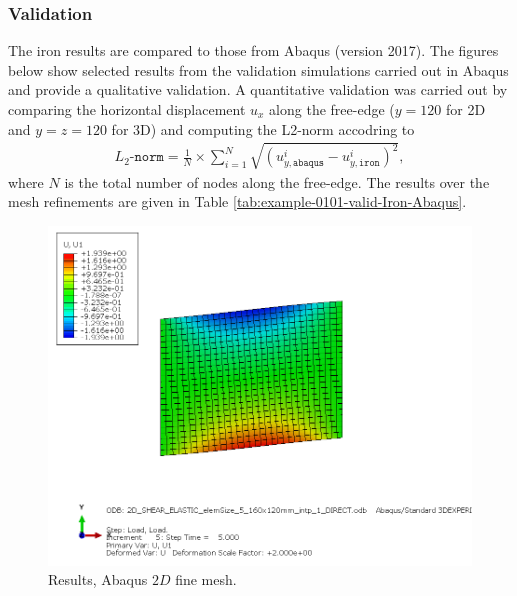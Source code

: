 \subsubsection{Validation}
%
The iron results are compared to those from Abaqus (version 2017). The figures below show selected results from the validation simulations carried out in Abaqus and provide a qualitative validation. A quantitative validation was carried out by comparing the horizontal displacement $u_x$ along the free-edge ($y=120$ for 2D and $y=z=120$ for 3D) and computing the L2-norm accodring to
\begin{align}
    L_2\texttt{-norm} = \frac{1}{N} \times \sum_{i=1}^{N} \sqrt{\left(u_{y,\texttt{abaqus}}^i-u_{y,\texttt{iron}}^i  \right)^2},
\end{align}
where $N$ is the total number of nodes along the free-edge. The results over the mesh refinements are given in Table \ref{tab:example-0101-valid-Iron-Abaqus}.
%
\begin{figure}[h!]
    \centering 
    \includegraphics[width=\columnwidth]{examples/example-0102/doc/figures/2D_SHEAR_ELASTIC_elemSize_5_160x120mm_intp_1_DIRECTU1.png} 
    \caption{Results, Abaqus $2D$ fine mesh.}
    \label{example-0102-abaqus-2D-fig}
\end{figure}
%
